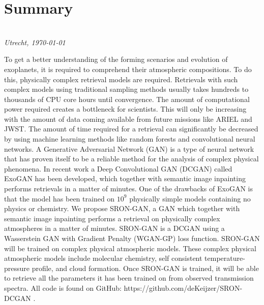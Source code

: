 \chapter*{Summary}


\begin{flushright}
{\makeatletter\itshape
    \@author \\
    Utrecht, \today
\makeatother}
\end{flushright}

To get a better understanding of the forming scenarios and evolution of exoplanets, it is required to comprehend their atmospheric compositions. To do this, physically complex retrieval models are required. Retrievals with such complex models using traditional sampling methods usually takes hundreds to thousands of CPU core hours until convergence. The amount of computational power required creates a bottleneck for scientists. This will only be increasing with the amount of data coming available from future missions like ARIEL and JWST. The amount of time required for a retrieval can significantly be decreased by using machine learning methods like random forests and convolutional neural networks. A Generative Adversarial Network (GAN) is a type of neural network that has proven itself to be a reliable method for the analysis of complex physical phenomena. In recent work \cite{zingales2018exogan} a Deep Convolutional GAN (DCGAN) called ExoGAN has been developed, which together with semantic image inpainting performs retrievals in a matter of minutes. One of the drawbacks of ExoGAN is that the model has been trained on $10^9$ physically simple models containing no physics or chemistry. We propose SRON-GAN, a GAN which together with semantic image inpainting performs a retrieval on physically complex atmospheres in a matter of minutes. SRON-GAN is a DCGAN using a  Wasserstein GAN with Gradient Penalty (WGAN-GP) loss function. SRON-GAN will be trained on complex physical atmospheric models. These complex physical atmospheric models include molecular chemistry, self consistent temperature-pressure profile, and cloud formation. Once SRON-GAN is trained, it will be able to retrieve all the parameters it has been trained on from observed transmission spectra. All code is found on GitHub: https://github.com/deKeijzer/SRON-DCGAN .